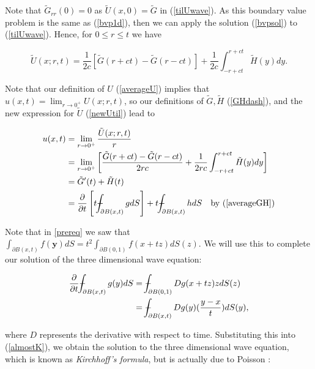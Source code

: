 \documentclass[a4paper, 12pt]{article}
\def\Xint#1{\mathchoice
{\XXint\displaystyle\textstyle{#1}}%
{\XXint\textstyle\scriptstyle{#1}}%
{\XXint\scriptstyle\scriptscriptstyle{#1}}%
{\XXint\scriptscriptstyle\scriptscriptstyle{#1}}%
\!\int}
\def\XXint#1#2#3{{\setbox0=\hbox{$#1{#2#3}{\int}$ }
\vcenter{\hbox{$#2#3$ }}\kern-.6\wd0}}
\def\dashint{\Xint-}
\numberwithin{equation}{section}
\begin{document}
Note that $\tilde{G}_{rr}(0)=0$ as $\tilde{U}(x,0)=\tilde{G}$ in (\ref{tilUwave}). As this boundary value problem is the same as (\ref{bvp1d}), then we can apply 
the solution (\ref{bvpsol}) to (\ref{tilUwave}). Hence, for $0 \le r \le t$ we have 

\begin{equation} \label{newUtil}
    \tilde{U}(x;r,t)=\frac{1}{2c}\left[\tilde{G}(r+ct)-\tilde{G}(r-ct)\right]+\frac{1}{2c}\int^{r+ct}_{-r+ct}\tilde{H}(y)dy.
\end{equation}

Note that our definition of $U$ (\ref{averageU}) implies that $u(x,t)=\lim_{r\rightarrow 0^+}U(x;r,t)$, so our definitions of $\tilde{G}, \tilde{H}$ (\ref{GHdash}),
 and the new expression for $\tilde{U}$ (\ref{newUtil}) lead to

\begin{equation} \label{almostK}
    \begin{aligned}
        u(x,t)&=\lim_{r\rightarrow 0^+}\frac{\tilde{U}(x;r,t)}{r}\\
        &=\lim_{r\rightarrow 0^+}\left[\frac{\tilde{G}(r+ct)-\tilde{G}(r-ct)}{2rc}+\frac{1}{2rc}\int^{r+ct}_{-r+ct}\tilde{H}(y)dy\right]\\
        &=\tilde{G}'(t)+\tilde{H}(t)\\
        &=\diffp[1]{}{t}\left[t\dashint_{\partial B(x,t)}{gdS} \right]+t\dashint_{\partial B(x,t)}{hdS} \quad \textrm{by (\ref{averageGH})}
    \end{aligned}
\end{equation}

Note that in \ref{prereq} we saw that $\int_{\partial B(x,t)}f(\boldsymbol{y})dS=t^2\int_{\partial B(0,1)} f(x+tz)dS(z)$. We will use this to complete our solution of the
three dimensional wave equation:

\begin{equation*}
    \begin{aligned}
    \diffp[1]{}{t}\dashint_{\partial B(x,t)} {g(y)dS} &= \dashint_{\partial B(0,1)} {Dg(x+tz)zdS(z)}\\
    &=\dashint_{\partial B(x,t)}{Dg(y)(\frac{y-x}{t})dS(y)},
    \end{aligned}
\end{equation*}

where $D$ represents the derivative with respect to time. Substituting this into (\ref{almostK}), we obtain the solution to the three dimensional wave equation, which is known as \emph{Kirchhoff's formula}, but is 
actually due to Poisson \cite{Str}:
\end{document}
